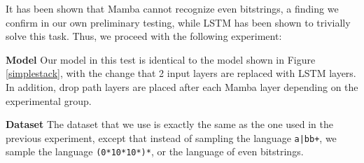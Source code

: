 It has been shown that Mamba cannot recognize even bitstrings\cite{ssmformal},
a finding we confirm in our own preliminary testing, while LSTM has been shown
to trivially solve this task. Thus, we proceed with the following experiment:

\textbf{Model} Our model in this test is identical to the model shown in
Figure \ref{simplestack}, with the change that 2 input layers are replaced with
LSTM layers.
In addition, drop path layers are placed after each Mamba layer depending on
the experimental group.

\textbf{Dataset}
The dataset that we use is exactly the same as the one used in the previous
experiment, except that instead of sampling the language \texttt{a|bb+},
we sample the language \texttt{(0*10*10*)*}, or the language of even bitstrings.


